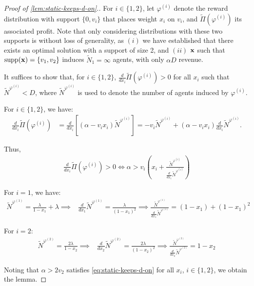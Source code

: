 \documentclass[12pt]{article}
\begin{document}
\begin{proof}[Proof of \cref{lem:static-keeps-d-on}.]
For $i\in \{1,2\}$, let $\varphi^{(i)}$ denote the reward distribution with support $\{0,v_i\}$ that places weight $x_i$ on $v_i$, and $\widetilde{\Pi}(\varphi^{(i)})$ its associated profit. Note that only considering distributions with these two supports is without loss of generality, as $(i)$ we have established that there exists an optimal solution with a support of size 2, and $(ii)$ $\mathbf{x}$ such that $\text{supp}(\mathbf{x}) = \{v_1,v_2\}$ induces $\widetilde{N}_1 = \infty$ agents, with only $\alpha D$ revenue.

It suffices to show that, for $i \in \{1,2\}$, $\frac{d}{dx_i}\widetilde{\Pi}(\varphi^{(i)}) > 0$ for all $x_i$ such that $\widetilde{N}^{\varphi^{(i)}} < D$, where $\widetilde{N}^{\varphi^{(i)}}$ is used to denote the number of agents induced by $\varphi^{(i)}$.

For $i \in \{1,2\}$, we have:
\begin{align*}
    \frac{d}{dx_i}\widetilde{\Pi}(\varphi^{(i)}) &= \frac{d}{dx_i} \left[(\alpha - v_ix_i) \widetilde{N}^{\varphi^{(i)}}\right] 
    = -v_i\widetilde{N}^{\varphi^{(i)}} + (\alpha-v_ix_i)\frac{d}{dx_i}\widetilde{N}^{\varphi^{(i)}}.
\end{align*}

Thus,
\begin{align}\label{eq:static-keeps-d-on}
    \frac{d}{dx_i}\widetilde{\Pi}(\varphi^{(i)}) > 0 \iff \alpha > v_i\left (x_i + \frac{\widetilde{N}^{\varphi^{(i)}}}{\frac{d}{dx_i}\widetilde{N}^{\varphi^{(i)}}}\right)
\end{align}


For $i = 1$, we have:
\begin{align*}
    \widetilde{N}^{\varphi^{(1)}} = \frac{\lambda}{1-x_1} + \lambda \implies & \frac{d}{dx_1}\widetilde{N}^{\varphi^{(1)}} = \frac{\lambda}{(1-x_1)^2} 
    \implies  \frac{\widetilde{N}^{\varphi^{(1)}}}{\frac{d}{dx_1}\widetilde{N}^{\varphi^{(1)}}} = (1-x_1) + (1-x_1)^2
\end{align*}

For $i = 2$:
\begin{align*}
    \widetilde{N}^{\varphi^{(2)}} = \frac{2\lambda}{1-x_2} \implies & \frac{d}{dx_2}\widetilde{N}^{\varphi^{(2)}} = \frac{2\lambda}{(1-x_2)^2} 
    \implies  \frac{\widetilde{N}^{\varphi^{(2)}}}{\frac{d}{dx_2}\widetilde{N}^{\varphi^{(2)}}} = 1-x_2
\end{align*}

Noting that $\alpha > 2v_2$ satisfies \eqref{eq:static-keeps-d-on} for all $x_i$, $i \in \{1,2\}$, we obtain the lemma.
\end{proof}
\end{document}
